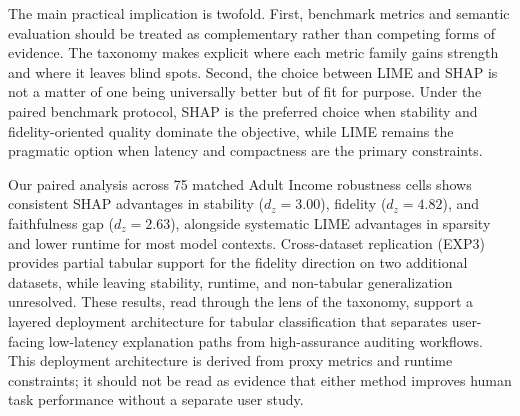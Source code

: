 \documentclass[twoside,11pt]{article}
\begin{document}
The main practical implication is twofold. First, benchmark metrics and
semantic evaluation should be treated as complementary rather than
competing forms of evidence. The taxonomy makes explicit where each
metric family gains strength and where it leaves blind spots. Second, the
choice between LIME and SHAP is not a matter of one being universally
better but of fit for purpose. Under the paired benchmark protocol, SHAP
is the preferred choice when stability and fidelity-oriented quality
dominate the objective, while LIME remains the pragmatic option when
latency and compactness are the primary constraints.

Our paired analysis across 75 matched Adult Income robustness cells shows
consistent SHAP advantages in stability ($d_z = 3.00$), fidelity
($d_z = 4.82$), and faithfulness gap ($d_z = 2.63$), alongside systematic
LIME advantages in sparsity and lower runtime for most model contexts.
Cross-dataset replication (EXP3) provides partial tabular support for the
fidelity direction on two additional datasets, while leaving stability,
runtime, and non-tabular generalization unresolved. These results, read
through the lens of the taxonomy, support a layered deployment
architecture for tabular classification that separates user-facing
low-latency explanation paths from high-assurance auditing workflows. This
deployment architecture is derived from proxy metrics and runtime
constraints; it should not be read as evidence that either method improves
human task performance without a separate user study.

\end{document}
